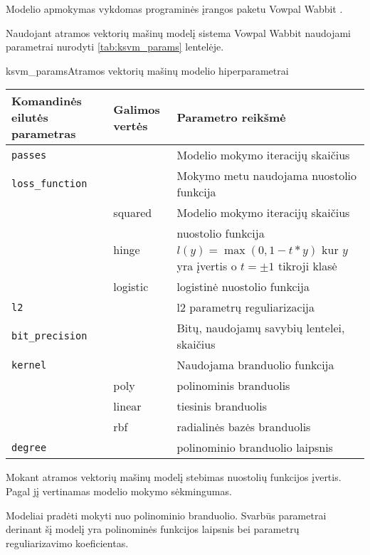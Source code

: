 
Modelio apmokymas vykdomas programinės įrangos paketu Vowpal Wabbit \cite{vw}.


Naudojant atramos vektorių mašinų modelį sistema Vowpal Wabbit naudojami parametrai nurodyti \vref{tab:ksvm_params} lentelėje.

\begin{ktutable}{ksvm_params}{Atramos vektorių mašinų modelio hiperparametrai}
    \begin{tabular}{| l | l | p{7cm}|}
    \hline
        Komandinės eilutės parametras & Galimos vertės & Parametro reikšmė\\ \hline
        \texttt{passes} &  & Modelio mokymo iteracijų skaičius \\ \hline
        \texttt{loss\_function} &          & Mokymo metu naudojama nuostolio funkcija \\
                               & squared  & Modelio mokymo iteracijų skaičius \\
                               & hinge    & nuostolio funkcija $l(y) = \max(0, 1 - t * y)$ kur $y$ yra įvertis o $t = \pm 1$ tikroji klasė  \\
                               & logistic & logistinė nuostolio funkcija \\ \hline
        \texttt{l2} & & l2 parametrų reguliarizacija \\ \hline
        \texttt{bit\_precision} & & Bitų, naudojamų savybių lentelei, skaičius\\ \hline
        \texttt{kernel} & & Naudojama branduolio funkcija   \\
                       & poly & polinominis branduolis     \\
                       & linear & tiesinis branduolis      \\
                       & rbf & radialinės bazės branduolis \\ \hline
        \texttt{degree} & & polinominio branduolio laipsnis \\ \hline
    \end{tabular}
\end{ktutable}

Mokant atramos vektorių mašinų modelį stebimas nuostolių funkcijos įvertis. Pagal jį
vertinamas modelio mokymo sėkmingumas.

Modeliai pradėti mokyti nuo polinominio branduolio. Svarbūs parametrai derinant šį modelį yra polinominės
funkcijos laipsnis bei parametrų reguliarizavimo koeficientas.

